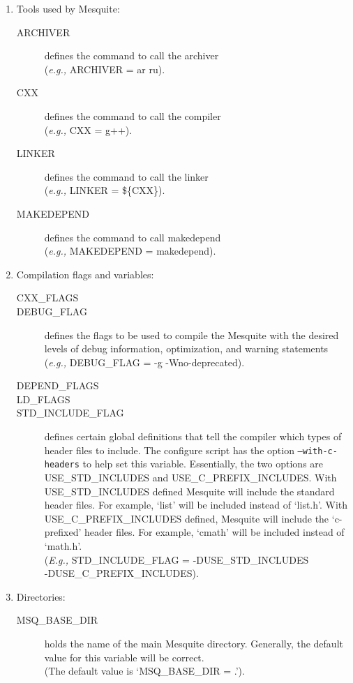 \documentclass[letter]{report}
\begin{document}
\begin{enumerate}

\item Tools used by Mesquite:
  \begin{description}
  \item[ARCHIVER] defines the command to call the archiver\\
    	({\it e.g.,} ARCHIVER = ar ru).
  \item[CXX] defines the command to call the compiler\\
	({\it e.g.,} CXX = g++).
  \item [LINKER] defines the command to call the linker\\
	({\it e.g.,} LINKER = \$\{CXX\}).
  \item[MAKEDEPEND] defines the command to call makedepend\\
	({\it e.g.,} MAKEDEPEND = makedepend).
  \end{description}

\item Compilation flags and variables:
  \begin{description}
  \item[CXX\_FLAGS]
  \item[DEBUG\_FLAG] defines the flags to be used to compile the Mesquite
	with the desired levels of debug information, optimization, and
	warning statements\\
	({\it e.g.,} DEBUG\_FLAG = -g -Wno-deprecated).
  \item[DEPEND\_FLAGS]
  \item[LD\_FLAGS]
  \item[STD\_INCLUDE\_FLAG] defines certain global definitions that
	tell the compiler which types of header files to include. The configure script has the
	option \texttt{--with-c-headers} to help set this variable.
 	Essentially, the two options are USE\_STD\_INCLUDES and
	USE\_C\_PREFIX\_INCLUDES.  With USE\_STD\_INCLUDES defined
	Mesquite will include the standard header files.  For example,
	`list' will be included instead of `list.h'.  With
	USE\_C\_PREFIX\_INCLUDES defined, Mesquite will include the
	`c-prefixed' header files.  For example, `cmath' will be
	included instead of `math.h'.  \\
	({\it E.g.,} STD\_INCLUDE\_FLAG = -DUSE\_STD\_INCLUDES\\
	-DUSE\_C\_PREFIX\_INCLUDES).
  \end{description}
\item Directories:
  \begin{description}
  \item[MSQ\_BASE\_DIR] holds the name of the main Mesquite directory.
	Generally, the default value for this variable will be correct.\\
	(The default value is `MSQ\_BASE\_DIR = .').
  \end{description}
\end{enumerate}
\end{document}
